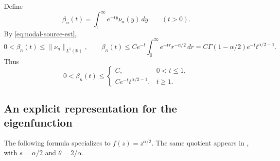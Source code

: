 \documentclass[11pt]{amsart}
\numberwithin{equation}{section}
\theoremstyle{remark}
\newcommand{\R}{\mathbb R}
\newcommand{\norm}[2][]{\lVert #2\rVert_{#1}}
\begin{document}
Define
\begin{equation}\label{eq:nodal-b-def}
 \beta_n(t)=\int_1^\infty e^{-ty}\nu_n(y)\,dy\qquad(t>0).
\end{equation}
By \eqref{eq:nodal-source-est},
\[
 0<\beta_n(t)\le\norm[L^1(\R)]{\nu_n},\qquad
 \beta_n(t)\le Ce^{-t}\int_0^\infty e^{-tr}r^{-\alpha/2}\,dr
 =C\Gamma(1-\alpha/2)e^{-t}t^{\alpha/2-1}.
\]
Thus
\begin{equation}\label{eq:nodal-b-est}
 0<\beta_n(t)\le
 \begin{cases}
 C,&0<t\le1,\\
 Ce^{-t}t^{\alpha/2-1},&t\ge1.
 \end{cases}
\end{equation}

\subsection{An explicit representation for the eigenfunction}
\label{subsec:nodal-representation}

The following formula specializes
\cite[Proposition~2.17(b), Corollary~2.16(b), and Proposition~2.18]{KwasnickiHalfLine}
to $f(z)=z^{\alpha/2}$. The same quotient appears in
\cite[Proposition~3.1]{DeNittiFernandezReal},
with $s=\alpha/2$ and $\theta=2/\alpha$.
\end{document}
